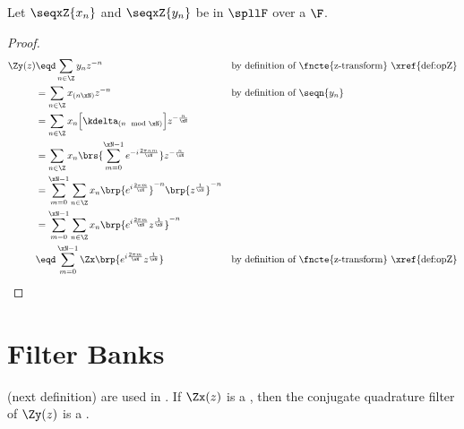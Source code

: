 \begin{theorem}
\label{thm:downsample}
Let $\seqxZ{x_n}$ and $\seqxZ{y_n}$ be   
in $\spllF$  over a  $\F$.
\end{theorem}
\begin{proof}
\begin{align*}
  \Zy(z)
    &\eqd \sum_{n\in\Z} y_n z^{-n}
    &&    \text{by definition of \fncte{z-transform} \xref{def:opZ}}
  \\&=    \sum_{n\in\Z} x_{(n\xN)} z^{-n}
    &&    \text{by definition of $\seqn{y_n}$}
  \\&=    \sum_{n\in\Z} x_n \Big[ \kdelta_{(n\mod \xN)} \Big] z^{-\frac{n}{\xN}}
  \\&=    \sum_{n\in\Z} x_n \brs{\sum_{m=0}^{\xN-1} e^{-i\frac{2\pi nm}{\xN}}} z^{-\frac{n}{\xN}}
  \\&=    \sum_{m=0}^{\xN-1} \sum_{n\in\Z} x_n 
                 \brp{e^{i\frac{2\pi m}{\xN}}}^{-n} 
                 \brp{ z^\frac{1}{\xN}}^{-n}
  \\&=    \sum_{m=0}^{\xN-1} \sum_{n\in\Z} x_n 
                 \brp{e^{i\frac{2\pi m}{\xN}} z^\frac{1}{\xN}}^{-n} 
  \\&\eqd \sum_{m=0}^{\xN-1}\Zx\brp{e^{i\frac{2\pi m}{\xN}} z^\frac{1}{\xN}}
    &&    \text{by definition of \fncte{z-transform} \xref{def:opZ}}
\end{align*}
\end{proof}





\section {Filter Banks}
 (next definition) are used in .
If $\Zx(z)$ is a , then the conjugate quadrature filter of $\Zy(z)$ is a .


